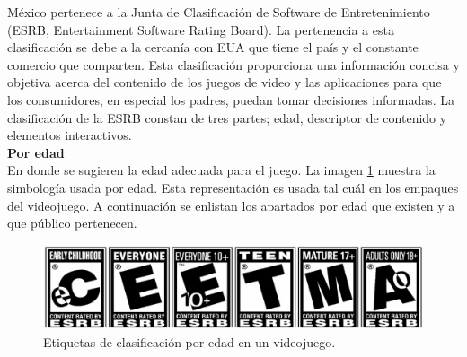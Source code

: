 	México pertenece a la Junta de Clasificación de Software de Entretenimiento (ESRB, Entertainment Software Rating Board)\cite{vid02}. La pertenencia a esta clasificación se debe a la cercanía con EUA que tiene el país y el constante comercio que comparten. Esta clasificación proporciona una información concisa y objetiva acerca del contenido de los juegos de video y las aplicaciones para que los consumidores, en especial los padres, puedan tomar decisiones informadas. La clasificación de la ESRB constan de tres partes; edad, descriptor de contenido y elementos interactivos.\\[1pt]
			
\textbf{Por edad}
\\[1pt]
En donde se sugieren la edad adecuada para el juego. La imagen \ref{fig:clasEti} muestra la simbología usada por edad. Esta representación es usada tal cuál en los empaques del videojuego. A continuación se enlistan los apartados por edad que existen y a que público pertenecen.	
\\[1pt]

	\begin{figure}
	\centering 
	\includegraphics[width=\textwidth]{03MarcoTeorico/imageR/clasEti}
	\caption{Etiquetas de clasificación por edad en un videojuego.}
	\label{fig:clasEti}
\end{figure}


